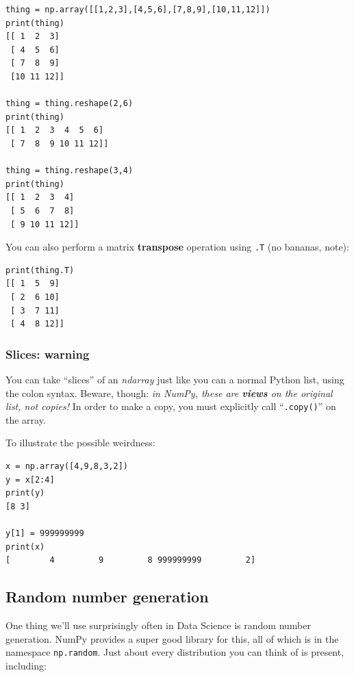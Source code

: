 \begin{Verbatim}[fontsize=\small,samepage=true,frame=single]
thing = np.array([[1,2,3],[4,5,6],[7,8,9],[10,11,12]])
print(thing)
[[ 1  2  3]
 [ 4  5  6]
 [ 7  8  9]
 [10 11 12]]

thing = thing.reshape(2,6)
print(thing)
[[ 1  2  3  4  5  6]
 [ 7  8  9 10 11 12]]

thing = thing.reshape(3,4)
print(thing)
[[ 1  2  3  4]
 [ 5  6  7  8]
 [ 9 10 11 12]]
\end{Verbatim}

You can also perform a matrix \textbf{transpose} operation using \texttt{.T}
(no bananas, note):

\begin{Verbatim}[fontsize=\small,samepage=true,frame=single]
print(thing.T)
[[ 1  5  9]
 [ 2  6 10]
 [ 3  7 11]
 [ 4  8 12]]
\end{Verbatim}

\subsubsection{Slices: warning}

You can take ``slices'' of an \textit{ndarray} just like you can a normal
Python list, using the colon syntax. Beware, though: \textit{in NumPy, these
are \textbf{views} on the original list, not copies!} In order to make a copy,
you must explicitly call ``\texttt{.copy()}'' on the array.

To illustrate the possible weirdness:

\begin{Verbatim}[fontsize=\footnotesize,samepage=true,frame=single]
x = np.array([4,9,8,3,2])
y = x[2:4]
print(y)
[8 3]

y[1] = 999999999
print(x)
[        4         9         8 999999999         2]

\end{Verbatim}

\subsection{Random number generation}

One thing we'll use surprisingly often in Data Science is random number
generation. NumPy provides a super good library for this, all of which is in
the namespace \texttt{np.random}. Just about every distribution you can think
of is present, including:


